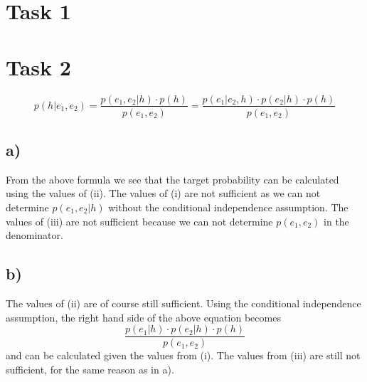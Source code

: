 \documentclass[%
   11pt,              %
   ngerman,           %
   a4paper,           %
   DIV11,             %
]{scrartcl}%
\begin{document}
\section*{Task 1}
\section*{Task 2}
\begin{equation*}
	p(h|e_1,e_2) = \frac{p(e_1,e_2|h) \cdot p(h)}{p(e_1,e_2)} = \frac{p(e_1|e_2,h) \cdot p(e_2|h) \cdot p(h)}{p(e_1,e_2)}
\end{equation*}
\subsection*{a)} From the above formula we see that the target probability can be calculated using the values of (ii). The values of (i) are not sufficient as we can not determine $p(e_1,e_2|h)$ without the conditional independence assumption. The values of (iii) are not sufficient because we can not determine $p(e_1,e_2)$ in the denominator.
\subsection*{b)} The values of (ii) are of course still sufficient. Using the conditional independence assumption, the right hand side of the above equation becomes
\begin{equation*}
\frac{p(e_1|h) \cdot p(e_2|h) \cdot p(h)}{p(e_1,e_2)}
\end{equation*}
and can be calculated given the values from (i). The values from (iii) are still not sufficient, for the same reason as in a).
\end{document}
